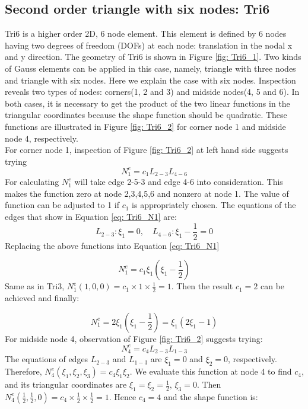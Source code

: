 \subsection{Second order triangle with six nodes: Tri6}
Tri6 is a higher order 2D, 6 node element. This element is defined by 6 nodes having two degrees of freedom (DOFs) at each node: translation in the nodal x and y direction. The geometry of Tri6 is shown in Figure \ref{fig: Tri6_1}.  Two kinds of Gauss elements can be applied in this case, namely, triangle with three nodes and triangle with six nodes. Here we explain the case with six nodes.  Inspection reveals two types of nodes: corners(1, 2 and 3) and midside nodes(4, 5 and 6). In both cases, it is necessary to get the product of the two linear functions in the triangular coordinates because the shape function should be quadratic. These functions are illustrated in Figure \ref{fig: Tri6_2} for corner node 1 and midside node 4, respectively. \\
For corner node 1, inspection of Figure \ref{fig: Tri6_2} at left hand side suggests trying
\begin{equation} \label{eq: Tri6_N1}
N_1^e = c_1L_{2-3}L_{4-6}
\end{equation}
For calculating $N_1^e$ will take edge 2-5-3 and edge 4-6 into consideration. This makes the function zero at node 2,3,4,5,6 and nonzero at node 1. The value of function can be adjusted to 1 if $c_1$ is appropriately chosen. The equations of the edges that show in Equation \ref{eq: Tri6_N1} are:
\begin{equation}
L_{2-3}: \xi_1 = 0, \quad L_{4-6}: \xi_1 - \frac{1}{2} = 0
\end{equation}
Replacing the above functions into Equation \ref{eq: Tri6_N1}

\begin{equation}
N_1^e = c_1\xi_1 \left(\xi_1 - \frac{1}{2}\right)
\end{equation}
Same as in Tri3, $N_1^e\left(1,0,0\right) = c_1 \times 1 \times \frac{1}{2} = 1$. Then the result $c_1 = 2$ can be achieved and finally: 

\begin{equation}
N_1^e = 2\xi_1\left(\xi_1 - \frac{1}{2}\right) = \xi_1 \left(2 \xi_1 -1 \right)
\end{equation} 
For midside node 4, observation of Figure \ref{fig: Tri6_2} suggests trying:
\begin{equation}
N_4^e = c_4L_{2-3}L_{1-3}
\end{equation}
The equations of edges $L_{2-3}$ and $L_{1-3}$ are $\xi_1 = 0$ and $\xi_2 = 0$, respectively. Therefore, $N_4^e\left(\xi_1, \xi_2, \xi_3\right) = c_4\xi_1\xi_2$. We evaluate this function at node 4 to find $c_4$, and its triangular coordinates are $\xi_1 = \xi_2 = \frac{1}{2}$, $\xi_3 = 0$. Then $N_4^e\left(\frac{1}{2}, \frac{1}{2}, 0\right) = c_4 \times \frac{1}{2} \times \frac{1}{2} = 1$. Hence $c_4 = 4$ and the shape function is:


